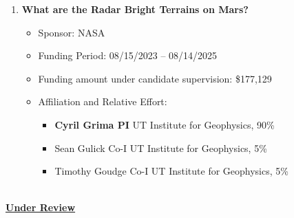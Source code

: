 \begin{enumerate}[leftmargin=2.5em, labelsep=1.5em, label=C\arabic*]
    \item
        \textbf{What are the Radar Bright Terrains on Mars?}
        \begin{itemize}[leftmargin=0em, labelsep=1em, topsep=-.5em, itemsep=-.2em]
            \item Sponsor: NASA
            \item Funding Period: 08/15/2023 – 08/14/2025
            \item Funding amount under candidate supervision: \$177,129
            \item Affiliation and Relative Effort:
            \TabPositions{4cm, 5.5cm}
            \begin{itemize}[leftmargin=2em, labelsep=1em, topsep=-.5em, itemsep=-.2em]
                \item \textbf{Cyril Grima \tab PI} \tab  UT Institute for Geophysics, 90\%
                \item Sean Gulick \tab Co-I \tab  UT Institute for Geophysics, 5\%
                \item Timothy Goudge \tab Co-I \tab  UT Institute for Geophysics, 5\%
            \end{itemize}
      \end{itemize}

\end{enumerate}




\textbf{\ul{\\ Under Review}}

